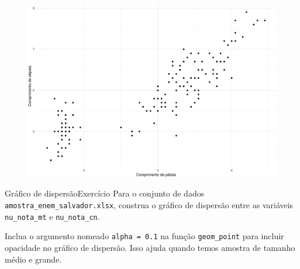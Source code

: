 \documentclass[
  10pt,
  ignorenonframetext,
]{beamer}
\begin{document}
\begin{frame}
\begin{figure}

{\centering \includegraphics[width=1\textwidth,height=\textheight]{exploracao-visualizacao_files/figure-beamer/unnamed-chunk-127-1.pdf}

}

\end{figure}
\end{frame}

\begin{frame}[fragile]{Gráfico de dispersão\newline Exercício}
\protect\hypertarget{gruxe1fico-de-dispersuxe3oexercuxedcio}{}
Para o conjunto de dados \texttt{amostra\_enem\_salvador.xlsx}, construa
o gráfico de dispersão entre as variáveis \texttt{nu\_nota\_mt} e
\texttt{nu\_nota\_cn}.

Inclua o argumento nomeado \texttt{alpha\ =\ 0.1} na função
\texttt{geom\_point} para incluir opacidade no gráfico de dispersão.
Isso ajuda quando temos amostra de tamanho médio e grande.
\end{frame}
\end{document}
